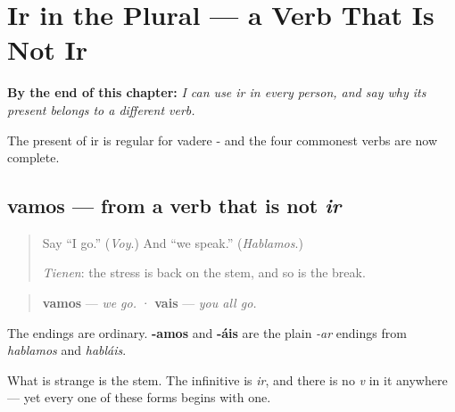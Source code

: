 
\chapter{Ir in the Plural --- a Verb That Is Not Ir}
\label{ch:spanish-ir-plural}

\begin{chapteropening}
\textbf{By the end of this chapter:} \emph{I can use ir in every person, and say why its present belongs to a different verb.}

The present of ir is regular for vadere - and the four commonest verbs are now complete.
\end{chapteropening}

\section[vamos · vais]{vamos — from a verb that is not \emph{ir}}

\label{lesson:ES-C10-vamos}



\begin{quote}
Say \textquotedblleft{}I go.\textquotedblright{} (\emph{Voy}.) And \textquotedblleft{}we speak.\textquotedblright{} (\emph{Hablamos}.)

\emph{Tienen}: the stress is back on the stem, and so is the break.
\end{quote}

\begin{grammarlens}[title={Grammar Lens: -amos and -áis, on a stem you have not seen}]
\begin{quote}
\textbf{vamos} — \emph{we go.}  ·  \textbf{vais} — \emph{you all go.}
\end{quote}

The endings are ordinary. \textbf{-amos} and \textbf{-áis} are the plain \emph{-ar} endings from \emph{hablamos} and \emph{habláis}.

What is strange is the stem. The infinitive is \emph{ir}, and there is no \emph{v} in it anywhere — yet every one of these forms begins with one.
\end{grammarlens}

